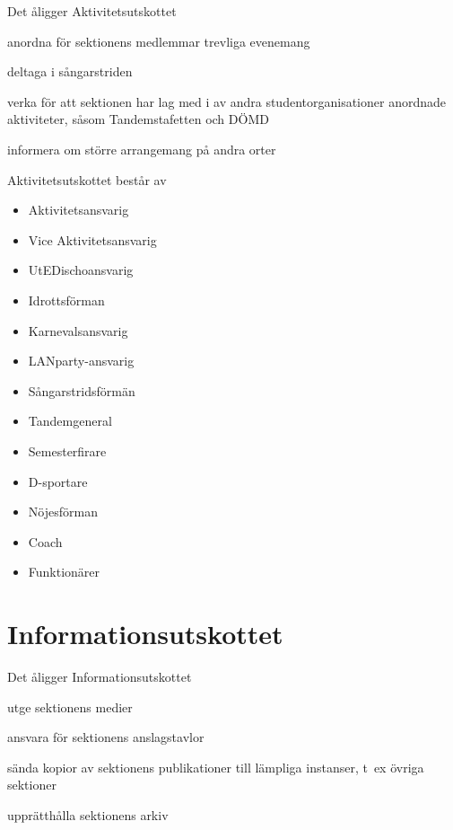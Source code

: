 \documentclass[pdfbookmarks,a4paper,11pt]{article}
\newlength{\itemcollength}
\newenvironment{reglemlista}{%
  \begin{list}{}{%
      \setlength{\labelwidth}{\itemcollength}%
      \setlength{\leftmargin}{\labelwidth + \labelsep}%
      \renewcommand{\makelabel}[1]{%
        \raisebox{0pt}[1ex][0pt]{%
          \makebox[\labelwidth][l]{%
            \parbox[t]{\itemcollength}{%
              \raggedright\hspace{0pt}##1}}}\hfill}%
      }}{%
  \end{list}}
\begin{document}
\begin{reglemlista}

	\item[Åligganden]
	Det åligger Aktivitetsutskottet
	\begin{attlista}
		\item anordna för sektionens medlemmar trevliga evenemang
		\item deltaga i sångarstriden
		\item verka för att sektionen har lag med i av andra studentorganisationer anordnade aktiviteter, såsom Tandemstafetten och DÖMD
		\item informera om större arrangemang på andra orter
	\end{attlista}

	\item[Sammansättning]
	Aktivitetsutskottet består av
	\begin{itemize}
		\item Aktivitetsansvarig
		\item Vice Aktivitetsansvarig
		\item UtEDischoansvarig
		\item Idrottsförman
		\item Karnevalsansvarig
		\item LANparty-ansvarig
		\item Sångarstridsförmän
		\item Tandemgeneral
		\item Semesterfirare
		\item D-sportare
		\item Nöjesförman
		\item Coach
		\item Funktionärer
	\end{itemize}


\section{Informationsutskottet}

\begin{reglemlista}

	\item[Åligganden]
	Det åligger Informationsutskottet
	\begin{attlista}
		\item utge sektionens medier
		\item ansvara för sektionens anslagstavlor
		\item sända kopior av sektionens publikationer till lämpliga instanser, t~ex övriga sektioner
		\item upprätthålla sektionens arkiv
	\end{attlista}


\end{reglemlista}
\end{reglemlista}
\end{document}

